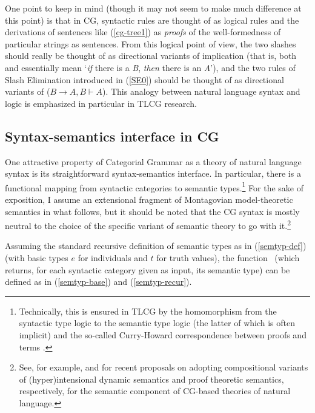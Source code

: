 \documentclass[output=paper,biblatex,babelshorthands,newtxmath,draftmode,colorlinks,citecolor=brown]{langscibook}
\begin{document}
One point to keep in mind (though it may not seem to make much difference at this point) is that in
CG, syntactic rules are thought of as logical rules and the derivations of sentences like
(\ref{cg-tree1}) as \emph{proofs} of the well-formedness of particular strings as sentences.  From
this logical point of view, the two slashes should really be thought of as
directional variants of implication (that is, both  and
 essentially mean `\emph{if} there is a
\textit{B}, \emph{then} there is an \textit{A}'), and the two rules of Slash Elimination introduced
in (\ref{SE0}) should be thought of as directional variants of 
($B \ensuremath{ \rightarrow } A, B \ensuremath{\vdash\xspace } A$). This analogy between natural
language syntax and logic is emphasized in particular in TLCG research.


\subsection{Syntax-semantics interface in CG \label{interface}}

One attractive property of Categorial Grammar as a theory of natural language syntax
is its straightforward syntax-semantics
interface. In particular, there is a 
functional mapping from syntactic categories to semantic
types.\footnote{Technically, this is ensured in TLCG by the 
homomorphism from the syntactic type logic to the semantic type logic
(the latter of which is often implicit) and the so-called Curry-Howard
correspondence between proofs and terms \citep{vanBenthem88}.}
For the sake of exposition, I assume an extensional fragment of
Montagovian model-theoretic semantics in what follows, but it should be noted that the
CG syntax is mostly neutral to the choice of the specific variant of
semantic theory to go with it.\footnote{See,  for example,  \citet{martin2013} and
\citet{bekkimineshima17} for recent proposals on adopting compositional variants
of (hyper)intensional dynamic semantics and proof theoretic semantics,
respectively, for the semantic component of CG-based theories of
natural language.}

Assuming the standard recursive definition of semantic types
as in (\ref{semtyp-def}) (with basic types $e$ for
individuals and $t$ for truth values), the function \SemTyp\ (which returns, for each
syntactic category given as input, its semantic type) can be defined as in
(\ref{semtyp-base}) and (\ref{semtyp-recur}).
\end{document}
